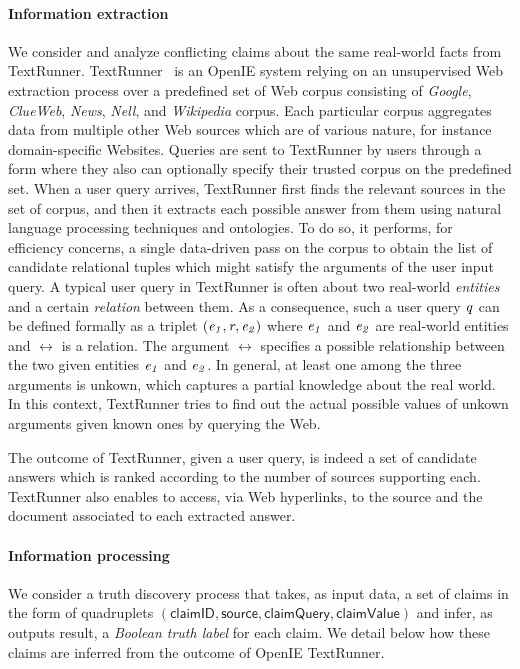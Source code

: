 \paragraph*{Information extraction} We consider and analyze 
conflicting claims about the same real-world facts from TextRunner.
TextRunner~\cite{Yates07, Etzioni08} is an OpenIE system relying
on an unsupervised Web extraction process over a predefined 
set of Web corpus consisting of \emph{Google}, \emph{ClueWeb}, \emph{News}, \emph{Nell}, and 
\emph{Wikipedia} corpus. Each particular corpus aggregates data from multiple 
other Web sources which are of various nature, for instance domain-specific Websites.
Queries are sent to TextRunner by users through a form where 
they also can optionally specify their trusted corpus on the predefined set.
When a user query arrives, TextRunner first finds the relevant
sources in the set of corpus, and then it extracts each possible answer from them
using natural language processing techniques and ontologies. 
To do so, it performs, for efficiency concerns, a single data-driven
pass on the corpus to obtain the list of candidate relational tuples 
which might satisfy the arguments of the user input query. 
A typical user query in TextRunner is often about 
two real-world \emph{entities} and a certain \emph{relation} between them.
As a consequence, such a user query $\mathit{q}$ can be defined formally as a triplet $(\mathit{e_{1}}, \mathit{r}_{}, \mathit{e_{2}})$
where $\mathit{e_{1}}$ and $\mathit{e_{2}}$ are real-world entities and $\rel{}$ is a relation. The argument $\rel{}$ 
specifies a possible relationship between the two given entities $\mathit{e_{1}}$ and $\mathit{e_{2}}$. In general,
at least one among the three arguments is unkown, which captures a partial knowledge about the real world. 
In this context, TextRunner tries to find out the actual possible values of unkown arguments given 
known ones by querying the Web.


The outcome of TextRunner, given a user query, is indeed a set of candidate answers which is ranked according 
to the number of sources supporting each. TextRunner also enables to access, via Web hyperlinks, to the source
and the document associated to each extracted answer.

\paragraph*{Information processing}
We consider a truth discovery process that takes, as input data, a set of claims 
in the form of quadruplets $(\textsf{claimID}, \textsf{source}, \textsf{claimQuery},\textsf{claimValue})$
and infer, as outputs result, a \emph{Boolean truth label} for each claim. 
We detail below how these claims are inferred from the outcome of OpenIE TextRunner.


